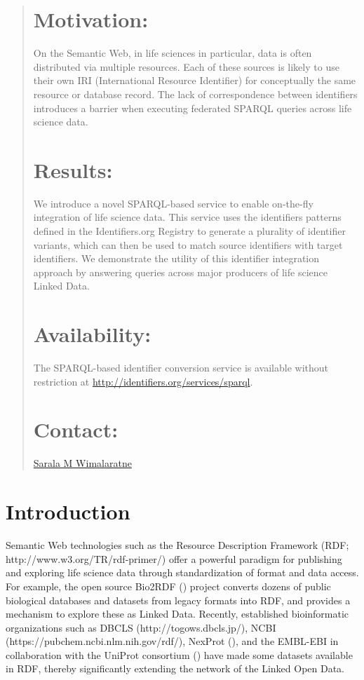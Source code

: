 \documentclass{bioinfo}
\begin{document}
\begin{abstract}
\section{Motivation:}
On the Semantic Web, in life sciences in particular, data is often distributed via multiple resources. Each of these sources is likely to use their own IRI (International Resource Identifier) for conceptually the same resource or database record. The lack of correspondence between identifiers introduces a barrier when executing federated SPARQL queries across life science data.

\section{Results:}
We introduce a novel SPARQL-based service to enable on-the-fly integration of life science data. This service uses the identifiers patterns defined in the Identifiers.org Registry to generate a plurality of identifier variants, which can then be used to match source identifiers with target identifiers. We demonstrate the utility of this identifier integration approach by answering queries across major producers of life science Linked Data.

\section{Availability:}
The SPARQL-based identifier conversion service is available without restriction at \linebreak\href{http://identifiers.org/services/sparql}{http://identifiers.org/services/sparql}.

\section{Contact:} \href{sarala@ebi.ac.uk}{Sarala M Wimalaratne}
\end{abstract}

\section{Introduction}
Semantic Web technologies such as the Resource Description Framework (RDF; http://www.w3.org/TR/rdf-primer/) offer a powerful paradigm for publishing and exploring life science data through standardization of format and data access. For example, the open source Bio2RDF (\cite{Biordf2}) project converts dozens of public biological databases and datasets from legacy formats into RDF, and provides a mechanism to explore these as Linked Data. Recently, established bioinformatic organizations such as DBCLS (http://togows.dbcls.jp/), NCBI (https://pubchem.ncbi.nlm.nih.gov/rdf/), NexProt (\cite{Chichester2014}), and the EMBL-EBI in collaboration with the UniProt consortium (\cite{Jupp01052014}) have made some datasets available in RDF, thereby significantly extending the network of the Linked Open Data.
\end{document}
